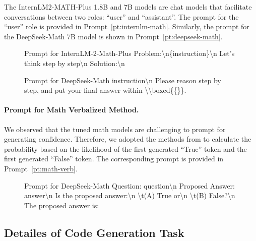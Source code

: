 The InternLM2-MATH-Plus 1.8B and 7B models are chat models that facilitate conversations between two roles: ``user'' and ``assistant''. 
The prompt for the “user” role is provided in Prompt~\ref{pt:internlm-math}. Similarly, the prompt for the DeepSeek-Math 7B model is shown in Prompt~\ref{pt:deepseek-math}.

\begin{figure}[htb!]
    \begin{promptbox}[label=pt:internlm-math]{Prompt for InternLM-2-Math-Plus}
    Problem:\textbackslash n\{instruction\}\textbackslash n Let's think step by step\textbackslash n Solution:\textbackslash n
    \end{promptbox}
\end{figure}

\begin{figure}[htb!]
    \begin{promptbox}[label=pt:deepseek-math]{Prompt for DeepSeek-Math}
    {instruction}\textbackslash n Please reason step by step, and put your final answer within \textbackslash\textbackslash boxed\{\{\}\}.
    \end{promptbox}
\end{figure}

\paragraph{Prompt for Math Verbalized Method.}

We observed that the tuned math models are challenging to prompt for generating confidence. Therefore, we adopted the methods from \citet{tian2023just} to calculate the probability based on the likelihood of the first generated ``True'' token and the first generated ``False'' token. The corresponding prompt is provided in Prompt~\ref{pt:math-verb}.

\begin{figure}[htb!]
    \begin{promptbox}[label=pt:math-verb]{Prompt for DeepSeek-Math}
    Question: {question}\textbackslash n Proposed Answer: {answer}\textbackslash n Is the proposed answer:\textbackslash n \textbackslash t(A) True or\textbackslash n \textbackslash t(B) False?\textbackslash n The proposed answer is:
    \end{promptbox}
\end{figure}

\subsection{Detailes of Code Generation Task}


